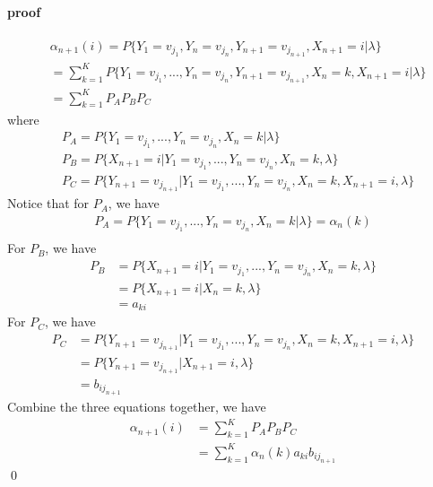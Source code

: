 \documentclass[runningheads]{llncs}
\begin{document}
\paragraph{proof}
\begin{align}
    &\alpha_{n+1}(i) 
    = P \{ Y_1 = v_{j_1}, Y_n = v_{j_n}, Y_{n+1} = v_{j_{n+1}}, X_{n+1} = i | \lambda \} \\
    &= \sum_{k=1}^K P \{ Y_1 = v_{j_1},..., Y_n = v_{j_n}, Y_{n+1} = v_{j_{n+1}}, X_{n} = k, X_{n+1} = i | \lambda \} \\
    &= \sum_{k=1}^K P_A P_B P_C
\end{align}
where
\begin{align}
    &P_A = P \{ Y_1 = v_{j_1},..., Y_n = v_{j_n}, X_{n} = k | \lambda \} \\
    &P_B = P \{ X_{n+1} = i | Y_1 = v_{j_1},..., Y_n = v_{j_n}, X_{n} = k, \lambda \} \\ 
    &P_C = P \{ Y_{n+1} = v_{j_{n+1}} | Y_1 = v_{j_1},..., Y_n = v_{j_n}, X_{n} = k, X_{n+1} = i, \lambda\}
\end{align}
Notice that for $P_A$, we have
\begin{align}
    P_A = P \{ Y_1 = v_{j_1},..., Y_n = v_{j_n}, X_{n} = k | \lambda \} = \alpha_n(k) \\
\end{align}
For $P_B$, we have
\begin{align}
    P_B &= P \{ X_{n+1} = i | Y_1 = v_{j_1},..., Y_n = v_{j_n}, X_{n} = k, \lambda \} \\
    &= P \{ X_{n+1} = i | X_{n} = k, \lambda \} \\
    &= a_{ki}
\end{align}
For $P_C$, we have
\begin{align}
    P_C &= P \{ Y_{n+1} = v_{j_{n+1}} | Y_1 = v_{j_1},..., Y_n = v_{j_n}, X_{n} = k, X_{n+1} = i, \lambda\} \\
    &= P \{ Y_{n+1} = v_{j_{n+1}} | X_{n+1} = i, \lambda\} \\
    &= b_{ij_{n+1}}
\end{align}
Combine the three equations together, we have
\begin{align}
    \alpha_{n+1}(i) &= \sum_{k=1}^K P_A P_B P_C \\
    &= \sum_{k=1}^K \alpha_n(k) a_{ki} b_{ij_{n+1}}
\end{align} \qed
\end{document}
